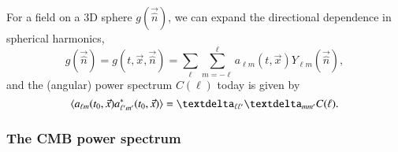     For a field on a 3D sphere $g(\vec{\hat{n}})$, we can expand the directional dependence in spherical harmonics,
    \begin{equation}\label{mil4:theo:eq:spherical_harmonics_expansion}
        g(\vec{\hat{n}}) = g(t, \vec{x}, \vec{\hat{n}})=  \sum_{\ell} \sum_{m=-\ell}^{\ell} a_{\ell m}(t, \vec{x}) Y_{\ell m} (\vec{\hat{n}}),
    \end{equation}
    and the (angular) power spectrum $C(\ell)$ today is given by
    \begin{equation}\label{mil4:theo:eq:defining_angular_power_spectrum}
        \avg{a\ellm(t_0, \vec{x}) a^\ast\ellmp(t_0, \vec{x})}= \deltasym{\ell \ell'} \deltasym{m m'} C(\ell).
    \end{equation}
    


\subsubsection{The CMB power spectrum}

